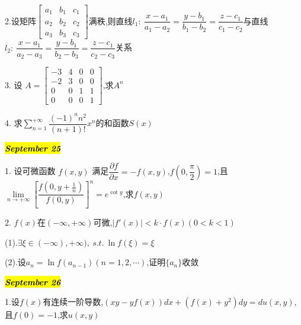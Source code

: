 2.设矩阵$\begin{bmatrix}
	a_{1}&b_{1}&c_{1}\\
	a_{2}&b_{2}&c_{2}\\
	a_{3}&b_{3}&c_{3}
\end{bmatrix}$满秩,则直线$l_{1}:\ \dfrac{x-a_{1}}{a_{1}-a_{2}}=\dfrac{y-b_{1}}{b_{1}-b_{2}}=\dfrac{z-c_{1}}{c_{1}-c_{2}}$与直线$l_{2}:\ \dfrac{x-a_{1}}{a_{2}-a_{3}}=\dfrac{y-b_{1}}{b_{2}-b_{3}}=\dfrac{z-c_{1}}{c_{2}-c_{3}}$关系
\begin{solution}
	
\end{solution}

3. 设 $A=\begin{bmatrix}
	-3&4&0&0\\
	-2&3&0&0\\
	0&0&1&1\\
	0&0&0&1
\end{bmatrix}$,求$A^{n}$
\begin{solution}
	
\end{solution}

4. 求$\sum\limits_{n=1}^{+\infty}\dfrac{(-1)^{n}n^{2}}{(n+1)!}x^{n}$的和函数$S(x)$
\begin{solution}
	
\end{solution}

\hl{\textbf{\textit{September 25}}}

1. 设可微函数 $f(x,y)$ 满足$\dfrac{\partial f}{\partial x}=-f(x,y)$,$f(0,\dfrac{\pi}{2})=1$,且$\lim\limits_{n\rightarrow +\infty}\left[\dfrac{f(0,y+\frac{1}{n})}{f(0,y)} \right]^{n}=e^{\cot y} $,求$f(x,y)$
\begin{solution}
	
\end{solution}

2. $f(x)$在$(-\infty,+\infty)$可微,$|f'(x)|<k\cdot f(x)(0<k<1)$

(1).$\exists \xi\in(-\infty),+\infty),\ s.t.\ \ln f(\xi)=\xi$

(2).设$a_{n}=\ln f(a_{n-1})(n=1,2,\cdots)$,证明$\{a_{n}\}$收敛
\begin{solution}
	
\end{solution}

\hl{\textbf{\textit{September 26}}}

1.设$f(x)$有连续一阶导数,$(xy-yf(x))dx+(f(x)+y^2)dy=du(x,y)$,且$f(0)=-1$,求$u(x,y)$
\begin{solution}
	
\end{solution}

